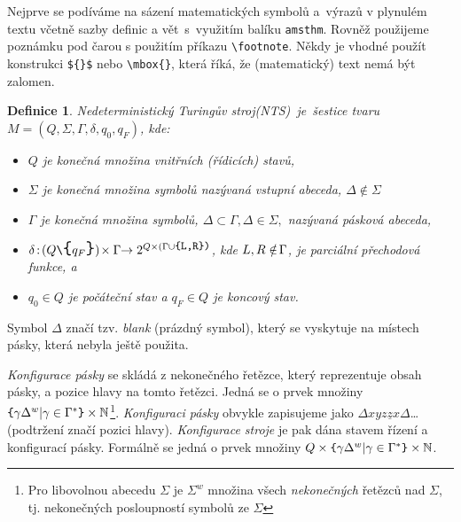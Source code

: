 \documentclass[11pt,twocolumn,a4paper]{article}
\newtheorem{theorem}{Definice}
\begin{document}
Nejprve se podíváme na sázení matematických symbolů a~výrazů v plynulém textu včetně sazby definic a vět~s~vy\-užitím balíku \texttt{amsthm}. Rovněž použijeme poznámku pod čarou s použitím příkazu \texttt{\textbackslash footnote}. Někdy je vhodné použít konstrukci \verb|${}$| nebo \verb|\mbox{}|, která říká, že (matematický) text nemá být zalomen.
\begin{theorem}
\label{def_1} \normalfont
Nedeterministický Turingův stroj\textit{(NTS)~je~šes\-tice tvaru $ M = (Q, \Sigma, \Gamma, \delta, q_0, q_F) $, kde:}
\begin{itemize}
    \item $Q$ \textit{je konečná množina} vnitřních (řídicích) stavů,
    \item $\Sigma$ \textit{je konečná množina symbolů nazývaná} vstupní abeceda, $\Delta \notin \Sigma$
    \item $\Gamma$ \textit{je konečná množina symbolů,} $\Delta \subset \Gamma , \Delta \in \Sigma , $ \textit{nazývaná} pásková abeceda,
    \item $\delta\hspace{-0.05cm} : \hspace{-0.05cm}{\large(}Q \verb|\| {\Large\verb|{|}q_F{\Large\verb|}|}{\large)} \hspace{-0.05cm}\times \Gamma \hspace{-0.1cm}\rightarrow 2^{\small Q \times ( \Gamma \cup \verb|{L,R})|}$\hspace{-0.1cm}, kde $L, R\notin\hspace{-0.05cm}\Gamma$, \textit{je parciální} přechodová funkce, a
    \item $q_0 \in Q$ \textit{je} počáteční stav a $q_F \in Q$ \textit{je} koncový stav.

\end{itemize}
\end{theorem}

Symbol $\Delta$ značí tzv. \textit{blank} (prázdný symbol), který se vyskytuje na místech pásky, která nebyla ještě použita.

\textit{Konfigurace pásky} se skládá z nekonečného řetězce, který reprezentuje obsah pásky, a pozice hlavy na tomto řetězci. Jedná se o prvek množiny $\verb|{| \gamma \Delta^w | \gamma \in \Gamma^* \verb|}| \times  \mathbb{N}$\footnote{Pro libovolnou abecedu $\Sigma$ je $\Sigma^w$ množina všech \textit{nekonečných} řetězců nad $\Sigma$, tj. nekonečných posloupností symbolů ze $\Sigma$}.\linebreak
\textit{Konfiguraci pásky} obvykle zapisujeme jako {\small$\Delta xyz{ \underline z}x \Delta$\dots} (podtržení značí pozici hlavy).
\textit{Konfigurace stroje} je pak dána stavem řízení a konfigurací pásky. Formálně se jedná o prvek množiny $Q \times \verb|{|\gamma \Delta^w | \gamma \in \Gamma ^* \verb|}| \times \mathbb{N}$.
\end{document}

